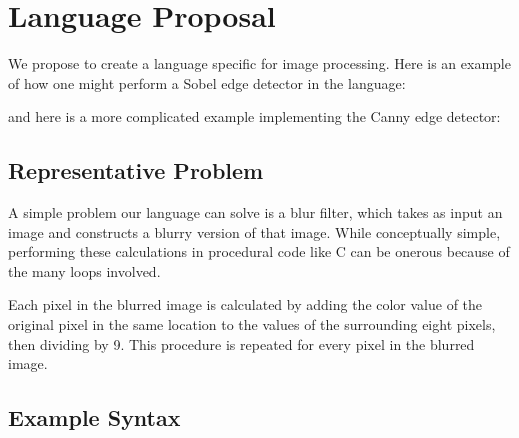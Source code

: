 \section{Language Proposal}


We propose to create a language specific for image processing.
Here is an example of how one might perform a Sobel edge detector
in the \sys{} language:

and here is a more complicated example implementing the Canny edge detector:
%


\subsection{Representative Problem}

A simple problem our language can solve is a blur filter, which takes as input
an image and constructs a blurry version of that image. While conceptually
simple, performing these calculations in procedural code like C can be onerous
because of the many loops involved.

Each pixel in the blurred image is calculated by adding the color value of
the original pixel in the same location to the values of the surrounding
eight pixels, then dividing by 9. This procedure is repeated for every pixel
in the blurred image.

\subsection{Example Syntax}

